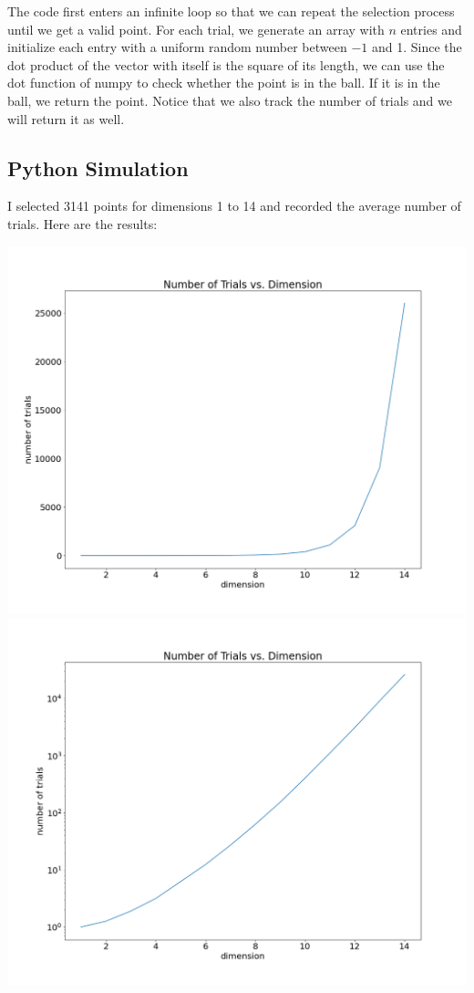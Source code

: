 \documentclass{article}
\begin{document}
The code first enters an infinite loop so that we can repeat the selection process until we get a valid point. For each trial, we generate an array with $n$ entries and initialize each entry with a uniform random number between $-1$ and 1. Since the dot product of the vector with itself is the square of its length, we can use the dot function of numpy to check whether the point is in the ball. If it is in the ball, we return the point. Notice that we also track the number of trials and we will return it as well.

\subsection{Python Simulation}

I selected 3141 points for dimensions 1 to 14 and recorded the average number of trials. Here are the results:

\begin{center}
    \includegraphics[scale=0.3]{manim/project/images/Trials vs. Dimension Linear.png}
    \includegraphics[scale=0.3]{manim/project/images/Trials vs. Dimension Log.png}
\end{center}
\end{document}
